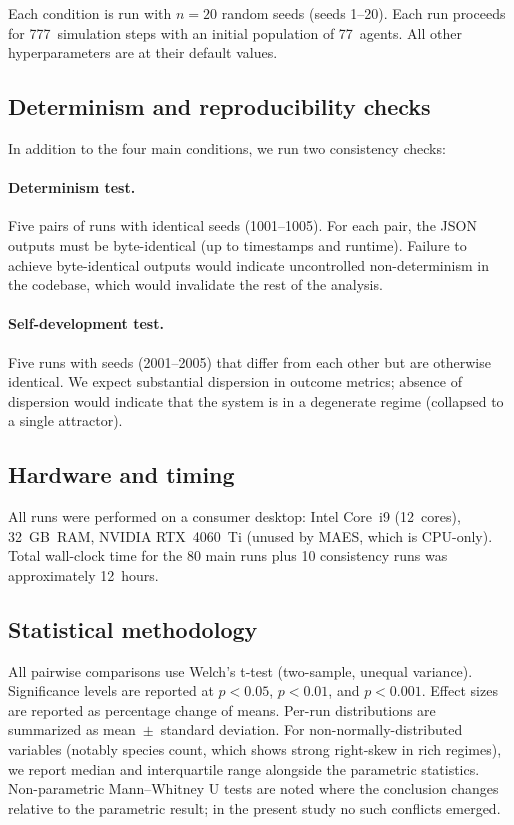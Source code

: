 \documentclass[11pt,a4paper]{article}
\begin{document}
Each condition is run with $n=20$ random seeds (seeds 1--20). Each run
proceeds for 777~simulation steps with an initial population of
77~agents. All other hyperparameters are at their default values.

\subsection{Determinism and reproducibility checks}

In addition to the four main conditions, we run two consistency checks:

\paragraph{Determinism test.} Five pairs of runs with identical seeds
(1001--1005). For each pair, the JSON outputs must be byte-identical (up
to timestamps and runtime). Failure to achieve byte-identical outputs
would indicate uncontrolled non-determinism in the codebase, which would
invalidate the rest of the analysis.

\paragraph{Self-development test.} Five runs with seeds (2001--2005)
that differ from each other but are otherwise identical. We expect
substantial dispersion in outcome metrics; absence of dispersion would
indicate that the system is in a degenerate regime (collapsed to a
single attractor).

\subsection{Hardware and timing}

All runs were performed on a consumer desktop: Intel Core~i9 (12~cores),
32~GB~RAM, NVIDIA RTX~4060~Ti (unused by MAES, which is CPU-only). Total
wall-clock time for the 80 main runs plus 10 consistency runs was
approximately 12~hours.

\subsection{Statistical methodology}

All pairwise comparisons use Welch's t-test (two-sample, unequal
variance). Significance levels are reported at $p<0.05$, $p<0.01$, and
$p<0.001$. Effect sizes are reported as percentage change of means.
Per-run distributions are summarized as mean~$\pm$~standard deviation.
For non-normally-distributed variables (notably species count, which
shows strong right-skew in rich regimes), we report median and
interquartile range alongside the parametric statistics. Non-parametric
Mann--Whitney U tests are noted where the conclusion changes relative to
the parametric result; in the present study no such conflicts emerged.
\end{document}
